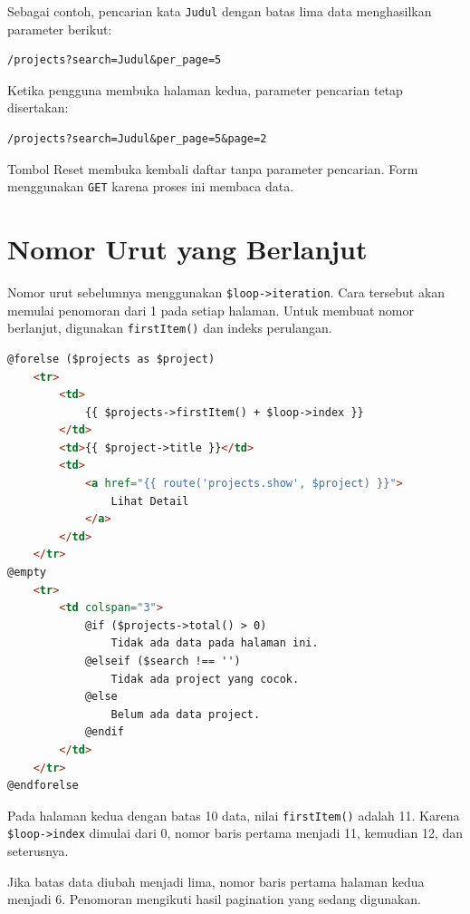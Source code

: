 \documentclass[a4paper,oneside,11pt]{book}
\renewcommand{\_}{\textunderscore\allowbreak{}}
\begin{document}
Sebagai contoh, pencarian kata \texttt{Judul} dengan batas lima data
menghasilkan parameter berikut:

\begin{lstlisting}[language={},caption={Contoh parameter pencarian}]
/projects?search=Judul&per_page=5
\end{lstlisting}

Ketika pengguna membuka halaman kedua, parameter pencarian tetap
disertakan:

\begin{lstlisting}[language={},caption={Contoh parameter pada halaman kedua}]
/projects?search=Judul&per_page=5&page=2
\end{lstlisting}

Tombol Reset membuka kembali daftar tanpa parameter pencarian.
Form menggunakan \texttt{GET} karena proses ini membaca data.

\section{Nomor Urut yang Berlanjut}

Nomor urut sebelumnya menggunakan \texttt{\$loop->iteration}.
Cara tersebut akan memulai penomoran dari 1 pada setiap halaman.
Untuk membuat nomor berlanjut, digunakan
\texttt{firstItem()} dan indeks perulangan.

\begin{lstlisting}[language=HTML,caption={Nomor urut pada tabel project}]
@forelse ($projects as $project)
    <tr>
        <td>
            {{ $projects->firstItem() + $loop->index }}
        </td>
        <td>{{ $project->title }}</td>
        <td>
            <a href="{{ route('projects.show', $project) }}">
                Lihat Detail
            </a>
        </td>
    </tr>
@empty
    <tr>
        <td colspan="3">
            @if ($projects->total() > 0)
                Tidak ada data pada halaman ini.
            @elseif ($search !== '')
                Tidak ada project yang cocok.
            @else
                Belum ada data project.
            @endif
        </td>
    </tr>
@endforelse
\end{lstlisting}

Pada halaman kedua dengan batas 10 data, nilai
\texttt{firstItem()} adalah 11.
Karena \texttt{\$loop->index} dimulai dari 0, nomor baris pertama
menjadi 11, kemudian 12, dan seterusnya.

Jika batas data diubah menjadi lima, nomor baris pertama halaman kedua
menjadi 6. Penomoran mengikuti hasil pagination yang sedang digunakan.
\end{document}
